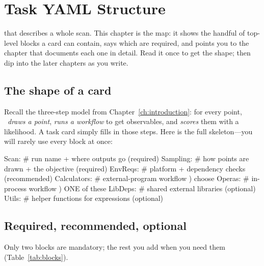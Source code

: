 \chapter{Task YAML Structure}
\label{ch:task-yaml}

 that describes a whole scan. This chapter is
the map: it shows the handful of top-level blocks a card can contain, says which are required,
and points you to the chapter that documents each one in detail. Read it once to get the shape;
then dip into the later chapters as you write.

\section{The shape of a card}
\label{sec:card-shape}

Recall the three-step model from Chapter~\ref{ch:introduction}: for every point, \Jarvis\
\emph{draws a point}, \emph{runs a workflow} to get observables, and \emph{scores} them with a
likelihood. A task card simply fills in those steps. Here is the full skeleton---you will rarely
use every block at once:

\begin{yamlwin}
Scan:          # run name + where outputs go          (required)
Sampling:      # how points are drawn + the objective  (required)
EnvReqs:       # platform + dependency checks           (recommended)
Calculators:   # external-program workflow  )  choose
Operas:        # in-process workflow        )  ONE of these
LibDeps:       # shared external libraries             (optional)
Utils:         # helper functions for expressions      (optional)
\end{yamlwin}

\section{Required, recommended, optional}
\label{sec:required-optional}

Only two blocks are mandatory; the rest you add when you need them
(Table~\ref{tab:blocks}).

